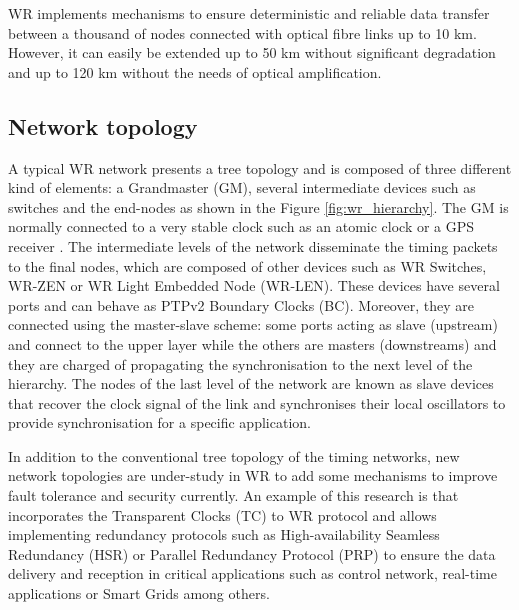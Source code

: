 WR implements mechanisms to ensure deterministic and reliable data transfer 
between a thousand of nodes connected with  optical fibre links up to 10 km. 
However, it can easily be extended up to 50 km without significant degradation 
and up to 120 km without the needs of optical amplification. 

\subsection{Network topology} 
\label{subsec:wr-net}

A typical WR network presents a tree topology and is composed of three different kind of elements: a Grandmaster (GM), several intermediate devices such as switches and the end-nodes as shown in the Figure \ref{fig:wr_hierarchy}. The GM is normally connected to a very stable clock such as an atomic clock or a GPS receiver \cite{Daniluk2012}. The intermediate levels of the network disseminate the timing packets to the final nodes, which are composed of other devices such as WR Switches, WR-ZEN or WR Light Embedded Node (WR-LEN). These devices have several ports and can behave as PTPv2 Boundary Clocks (BC). Moreover, they are connected using the master-slave scheme: some ports acting as slave (upstream) and connect to the upper layer while the others are masters (downstreams) and they are charged of propagating the synchronisation to the next level of the hierarchy. The nodes of the last level of the network are known as slave devices that recover the clock signal of the link and synchronises their local oscillators to provide synchronisation for a specific application.

In addition to the conventional tree topology of the timing networks, new network topologies are under-study in WR to add some mechanisms to improve fault tolerance and security currently. An example of this research is \cite{jlgutierrez-paper-redundancy} that incorporates the Transparent Clocks (TC) to WR protocol and allows implementing redundancy protocols such as High-availability Seamless Redundancy (HSR) or Parallel Redundancy Protocol (PRP) to ensure the data delivery and reception in critical applications such as control network, real-time applications or Smart Grids among others.

